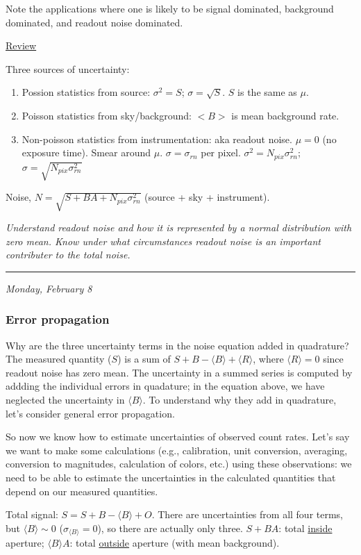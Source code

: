\documentclass[12pt]{article}
\newcommand{\mynotes}[1]{\textcolor{myBlue}{#1}}
\newcommand{\test}[1]{%
    \begin{center}
        {\parbox{0.9\textwidth}{\textit{\small#1}}}
    \end{center}}
\newcommand{\mydate}[1]{
    \begin{flushright}
        \rule{\textwidth}{0.4pt} %
        \footnotesize\hfill\textit{#1}
    \end{flushright}}
\begin{document}
Note the applications where one is likely to be signal dominated,
background dominated, and readout noise dominated.

\mynotes{{\large\underline{Review}}}

Three sources of uncertainty:
\begin{enumerate}
    \item Possion statistics from source: $\sigma^{2} = S$;
        $\sigma = \sqrt{S}$. $S$ is the same as $\mu$.
    \item Poisson statistics from sky/background:
        $<B>$ is mean background rate.
    \item Non-poisson statistics from instrumentation:
        aka readout noise. $\mu=0$ (no exposure time).
        Smear around $\mu$. $\sigma = \sigma_{rn}$ per pixel.
        $\sigma^{2} = N_{pix}\sigma_{rn}^{2}$;
        $\sigma = \sqrt{N_{pix}\sigma_{rn}^{2}}$
\end{enumerate}
Noise, $N = \sqrt{S+BA+N_{pix}\sigma_{rn}^{2}}$
(source + sky + instrument).

\test{Understand readout noise and how it is represented by a normal distribution
with zero mean. Know under what circumstances readout noise is an important
contributer to the total noise.}

\mydate{Monday, February 8}
\subsubsection{Error propagation}
Why are the three uncertainty terms in the noise equation added in quadrature?
The measured quantity ($S$) is a sum of
$S + B -  \langle  B  \rangle  +  \langle  R \rangle $,
where $\langle  R  \rangle  = 0$
since readout noise has zero mean. The uncertainty in a summed series is
computed by addding the individual errors in quadature; in the equation above,
we have neglected the uncertainty in $\langle  B  \rangle$. To understand why they add in
quadrature, let's consider general error propagation.

\mynotes{So now we know how to estimate uncertainties of observed count rates.
Let's say we want to make some calculations (e.g., calibration, unit
conversion, averaging, conversion to magnitudes, calculation of
colors, etc.) using these observations: we need to be able to estimate
the uncertainties in the calculated quantities that depend on our
measured quantities.}

\mynotes{Total signal: $ S=S+B- \langle B \rangle +O $. There are uncertainties
from all four terms, but $ \langle B \rangle  \sim 0$ ($\sigma_{ \langle B
\rangle }=0$), so there are actually only three. $S+BA$: total
\underline{inside} aperture; $ \langle B \rangle A$: total \underline{outside}
aperture (with mean background).}
\end{document}
